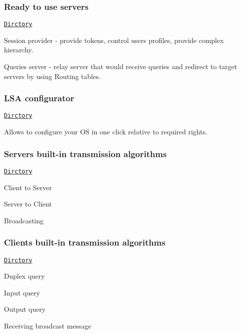 \subsubsection*{Ready to use servers}

\href{./Examples/Servers/}{\tt Dirctory}
\begin{DoxyItemize}
\item Session provider -\/ provide tokens, control users profiles, provide complex hierarchy.
\item Queries server -\/ relay server that would receive queries and redirect to target servers by using {\ttfamily Routing tables}.
\end{DoxyItemize}

\subsubsection*{L\+SA configurator}

\href{./Core/PipesProvider/Security/}{\tt Dirctory}

Allows to configure your OS in one click relative to required rights.

\subsubsection*{Server\textquotesingle{}s built-\/in transmission algorithms}

\href{./Core/PipesProvider/Server/TransmisssionControllers/}{\tt Dirctory}


\begin{DoxyItemize}
\item Client to Server
\item Server to Client
\item Broadcasting
\end{DoxyItemize}

\subsubsection*{Client\textquotesingle{}s built-\/in transmission algorithms}

\href{./Core/UniformClient/Providers/PipesProvider/BaseClientPPHandlers.cs}{\tt Dirctory}


\begin{DoxyItemize}
\item Duplex query
\item Input query
\item Output query
\item Receiving broadcast message 
\end{DoxyItemize}